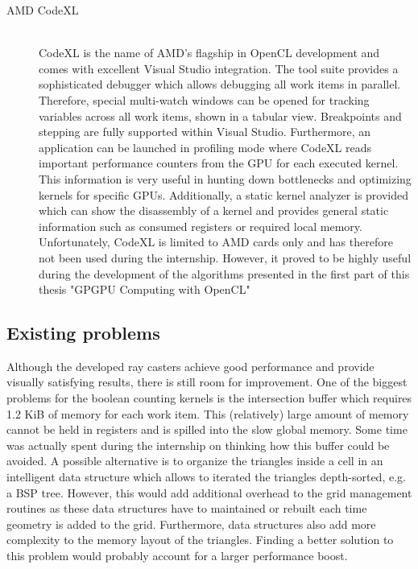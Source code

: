\begin{description}
\item[AMD CodeXL] \hfill \\
CodeXL is the name of AMD's flagship in OpenCL development and comes with excellent Visual Studio integration. The tool suite provides a sophisticated debugger which allows debugging all work items in parallel. Therefore, special multi-watch windows can be opened for tracking variables across all work items, shown in a tabular view. Breakpoints and stepping are fully supported within Visual Studio. Furthermore, an application can be launched in profiling mode where CodeXL reads important performance counters from the GPU for each executed kernel. This information is very useful in hunting down bottlenecks and optimizing kernels for specific GPUs. Additionally, a static kernel analyzer is provided which can show the disassembly of a kernel and provides general static information such as consumed registers or required local memory. Unfortunately, CodeXL is limited to AMD cards only and has therefore not been used during the internship. However, it proved to be highly useful during the development of the algorithms presented in the first part of this thesis "GPGPU Computing with OpenCL"
\end{description}

\subsection{Existing problems}

Although the developed ray casters achieve good performance and provide visually satisfying results, there is still room for improvement. One of the biggest problems for the boolean counting kernels is the intersection buffer which requires 1.2 KiB of memory for each work item. This (relatively) large amount of memory cannot be held in registers and is spilled into the slow global memory. Some time was actually spent during the internship on thinking how this buffer could be avoided. A possible alternative is to organize the triangles inside a cell in an intelligent data structure which allows to iterated the triangles depth-sorted, e.g. a BSP tree. However, this would add additional overhead to the grid management routines as these data structures have to maintained or rebuilt each time geometry is added to the grid. Furthermore, data structures also add more complexity to the memory layout of the triangles. Finding a better solution to this problem would probably account for a larger performance boost.

